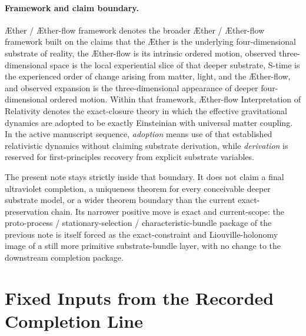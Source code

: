 \documentclass[11pt]{article}
\newcommand{\Aether}{\AE{}ther}
\newcommand{\Aflow}{\AE{}ther-flow}
\newcommand{\TheoryName}{\Aflow{} Interpretation of Relativity}
\newcommand{\TheoryProgram}{\Aether{} / \Aflow{} framework}
\begin{document}
\paragraph{Framework and claim boundary.}
\TheoryProgram{} denotes the broader \Aether{} / \Aflow{} framework built on the claims that the \Aether{} is the underlying four-dimensional substrate of reality, the \Aflow{} is its intrinsic ordered motion, observed three-dimensional space is the local experiential slice of that deeper substrate, S-time is the experienced order of change arising from matter, light, and the \Aflow{}, and observed expansion is the three-dimensional appearance of deeper four-dimensional ordered motion. Within that framework, \TheoryName{} denotes the exact-closure theory in which the effective gravitational dynamics are adopted to be exactly Einsteinian with universal matter coupling. In the active manuscript sequence, \emph{adoption} means use of that established relativistic dynamics without claiming substrate derivation, while \emph{derivation} is reserved for first-principles recovery from explicit substrate variables.

The present note stays strictly inside that boundary. It does not claim a final ultraviolet completion, a uniqueness theorem for every conceivable deeper substrate model, or a wider theorem boundary than the current exact-preservation chain. Its narrower positive move is exact and current-scope: the proto-process / stationary-selection / characteristic-bundle package of the previous note is itself forced as the exact-constraint and Liouville-holonomy image of a still more primitive substrate-bundle layer, with no change to the downstream completion package.

\section{Fixed Inputs from the Recorded Completion Line}
\end{document}
